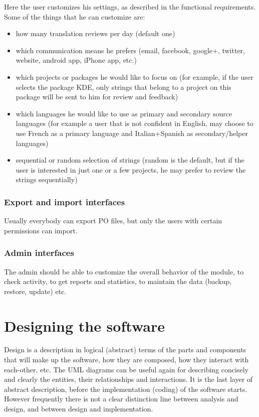\documentclass[11pt]{article}
\begin{document}
    Here the user customizes his settings, as described in the
    functional requirements.  Some of the things that he can customize
    are:
\begin{itemize}
\item how many translation reviews per day (default one)
\item which communication means he prefers (email, facebook, google+,
       twitter, website, android app, iPhone app, etc.)
\item which projects or packages he would like to focus on (for
       example, if the user selects the package KDE, only strings that
       belong to a project on this package will be sent to him for
       review and feedback)
\item which languages he would like to use as primary and secondary
       source languages (for example a user that is not confident in
       English, may choose to use French as a primary language and
       Italian+Spanish as secondary/helper languages)
\item sequential or random selection of strings (random is the
       default, but if the user is interested in just one or a few
       projects, he may prefer to review the strings sequentially)
\end{itemize}
\subsubsection{Export and import interfaces}
\label{sec-4.2.4}


    Usually everybody can export PO files, but only the users with
    certain permissions can import.


\subsubsection{Admin interfaces}
\label{sec-4.2.5}


    The admin should be able to customize the overall behavior of the
    module, to check activity, to get reports and statistics, to
    maintain the data (backup, restore, update) etc.
    

\section{Designing the software}
\label{sec-5}


  Design is a description in logical (abstract) terms of the parts and
  components that will make up the software, how they are composed,
  how they interact with each-other, etc. The UML diagrams can be
  useful again for describing concisely and clearly the entities,
  their relationships and interactions.  It is the last layer of
  abstract description, before the implementation (coding) of the
  software starts. However frequently there is not a clear distinction
  line between analysis and design, and between design and
  implementation.
\end{document}
